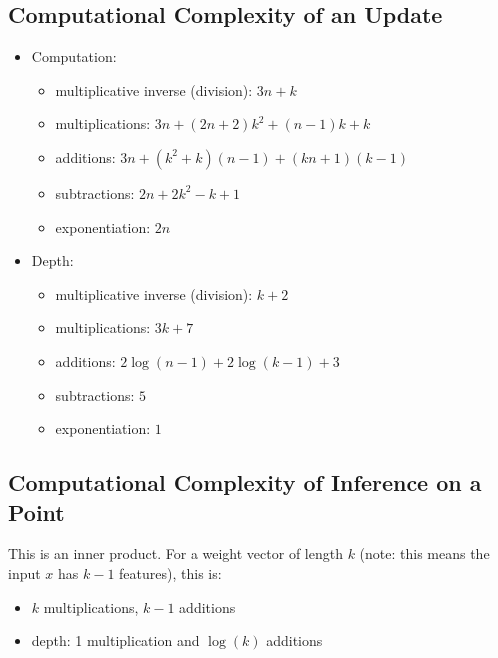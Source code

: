 \subsection{Computational Complexity of an Update}

\begin{itemize}
	\item Computation:
	\begin{itemize}
		\item multiplicative inverse (division): $3n+k$
		\item multiplications: $3n+ (2n+2)k^{2} + (n-1)k + k $
		\item additions: $3n+ (k^{2}+k)(n-1) + (kn+1)(k-1)$
		\item subtractions:  $2n + 2k^{2} -k+1$
		\item exponentiation: $2n$
	\end{itemize}
	\item Depth:
	\begin{itemize}
		\item multiplicative inverse (division): $k+2$
		\item multiplications: $3k+7$
		\item additions: $ 2 \log(n-1) + 2\log(k-1) + 3$
		\item subtractions: $5$
		\item exponentiation: $1$
	\end{itemize}
	

\end{itemize}

\subsection{Computational Complexity of Inference on a Point}
This is an inner product. For a weight vector of length $k$ (note: this means the input $x$ has $k-1$ features), this is:
\begin{itemize}
	\item $k$ multiplications, $k-1$ additions
	\item depth: 1 multiplication and $\log(k)$ additions
\end{itemize}
